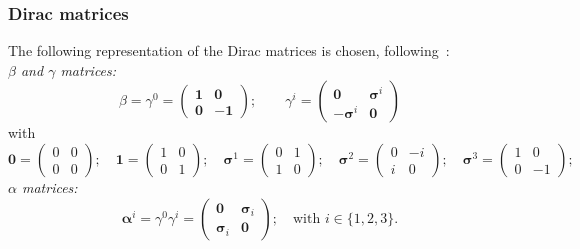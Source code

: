 \subsubsection*{Dirac matrices}
The following representation of the Dirac matrices is chosen, following~\cite{greiner2000}:\\
\textit{$\beta$ and $\gamma$ matrices:}\\[-10pt]
\begin{equation}
\beta=\gamma^0 =
\begin{pmatrix}
\boldsymbol{1}&\boldsymbol{0}\\
\boldsymbol{0}&\boldsymbol{-1}
\end{pmatrix};\qquad
\gamma^{i} = 
\begin{pmatrix}
\boldsymbol{0}&\boldsymbol{\sigma}^i\\
-\boldsymbol{\sigma}^i&\boldsymbol{0}
\end{pmatrix}
\end{equation}
with\\[-10pt]
\begin{equation}
\boldsymbol{0}=
\begin{pmatrix}
0&0\\0&0
\end{pmatrix};\quad
\boldsymbol{1}=
\begin{pmatrix}
1&0\\0&1
\end{pmatrix};\quad
\boldsymbol{\sigma}^1=
\begin{pmatrix}
0&1\\1&0
\end{pmatrix};\quad
\boldsymbol{\sigma}^2=
\begin{pmatrix}
0&-i\\i&0
\end{pmatrix};\quad
\boldsymbol{\sigma}^3=
\begin{pmatrix}
1&0\\0&-1
\end{pmatrix};\quad
\end{equation}
\textit{$\alpha$ matrices:}
\begin{equation}
\boldsymbol{\alpha}^i = \gamma^0 \gamma^i =
\begin{pmatrix}
\boldsymbol{0}&\boldsymbol{\sigma}_i\\
\boldsymbol{\sigma}_i&\boldsymbol{0}
\end{pmatrix}
;\quad\text{with }i \in \{1,2,3\}.
\end{equation}
$\phantom{1}$


